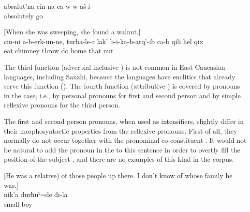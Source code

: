 \begin{exe}
	\ex	\label{ex:He went completely on his own (alone)@15c}
	\gll	absalut'na	cin-na	ca-w	w-aš-i\\
		absolutely			go\\
	\glt	{}
	
	\ex	\label{ex:‎‎She did not eat the nut herself, but threw it through the chimney into the house@3a} [When she was sweeping, she found a walnut.]\\
	\gll	cin-ni	a-b-erk-un-ne,	turba-le-r	lak' 	b-i-ka-b-arq'-ib	ca-b	qili	hel	qix\\
			eat	chimney	throw	do		home	that	nut\\
	\glt	{}
\end{exe}

The third function (adverbial-inclusive ) is not common in East Caucasian languages, including Sanzhi, because the languages have  enclitics that already serve this function (). The fourth function (attributive ) is covered by pronouns in the  case, i.e., by personal pronouns for first and second person and by simple reflexive pronouns for the third person. 

The first and second person  pronouns, when used as intensifiers, slightly differ in their morphosyntactic properties from the reflexive pronouns. First of all, they normally do not occur together with the pronominal co-constituent . It would not be natural to add the pronoun in the  to this sentence in order to overtly fill the position of the  subject , and there are no examples of this kind in the corpus.
%

\begin{exe}
	\ex	\label{ex:ex:I was a little boy@BREFLIST}
	\begin{xlist}
	\ex	\label{ex:I was a little boy@BREFL} [He was a relative) of those people up there. I don't know of whose family he was.] \\
	\gll	nik'a	durħuˁ=de	di-la\\
		small	boy	\\
	\glt	{}
	
		\end{xlist}
\end{exe}

